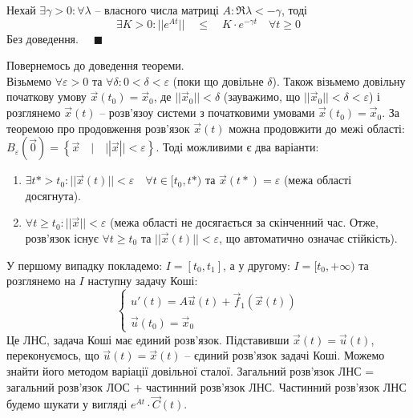 \documentclass[14pt,a4paper]{scrartcl}
\theoremstyle{definition}
\theoremstyle{definition}
\theoremstyle{definition}
\begin{document}
\begin{boxlema}
  Нехай $\exists \gamma > 0 : \forall \lambda$ -- власного числа матриці $A: \Re \lambda < - \gamma$, тоді $$\exists K > 0 : ||e^{At}|| \quad \leq  \quad K \cdot e^{-\gamma t} \quad \forall t \geq 0$$
  Без доведення. $\quad \blacksquare$
\end{boxlema}

Повернемось до доведення теореми. \\ Візьмемо $\forall \varepsilon > 0$ та $\forall \delta : 0 < \delta < \varepsilon$ (поки що довільне $\delta$). Також візьмемо довільну початкову умову $\overrightarrow{x}(t_0) = \overrightarrow{x}_0$, де $||\overrightarrow{x}_0|| < \delta$ (зауважимо, що $||\overrightarrow{x}_0|| < \delta < \varepsilon$) і розглянемо $\overrightarrow{x}(t)$ -- розв'язоу системи з початковими умовами $\overrightarrow{x}(t_0) = \overrightarrow{x}_0$. За теоремою про продовження розв'язок $\overrightarrow{x}(t)$ можна продовжити до межі області: $B_{\varepsilon}(\overrightarrow{0}) = \left\{ \overrightarrow{x} \quad | \quad ||\overrightarrow{x}|| < \varepsilon \right\}$. Тоді можливими є два варіанти:
\begin{enumerate}
  \item $\exists t* > t_0 : ||\overrightarrow{x}(t)|| < \varepsilon \quad \forall t \in [t_0, t*)$ та $\overrightarrow{x}(t*) = \varepsilon$ (межа області досягнута).
  \item $\forall t \geq t_0 : ||\overrightarrow{x}|| < \varepsilon$ (межа області не досягається за скінченний час. Отже, розв'язок існує $\forall t \geq t_0$ та $||\overrightarrow{x}(t)|| < \varepsilon$, що автоматично означає стійкість).
\end{enumerate}

У першому випадку покладемо: $I = [t_0, t_1]$, а у другому: $I = [t_0, +\infty)$ та розглянемо на $I$ наступну задачу Коші: $$\begin{cases} u'(t) = A\overrightarrow{u}(t) + \overrightarrow{f}_1(\overrightarrow{x}(t)) \\ \overrightarrow{u}(t_0) = \overrightarrow{x}_0 \end{cases}$$ Це ЛНС, задача Коші має единий розв'язок. Підставивши $\overrightarrow{x}(t) = \overrightarrow{u}(t)$, переконуємось, що $\overrightarrow{u}(t) = \overrightarrow{x}(t)$ -- єдиний розв'язок задачі Коші. Можемо знайти його методом варіації довільної сталої. Загальний розв'язок ЛНС = загальний розв'язок ЛОС + частинний розв'язок ЛНС. Частинний розв'язок ЛНС будемо шукати у вигляді $e^{At} \cdot \overrightarrow{C}(t)$.
\end{document}

